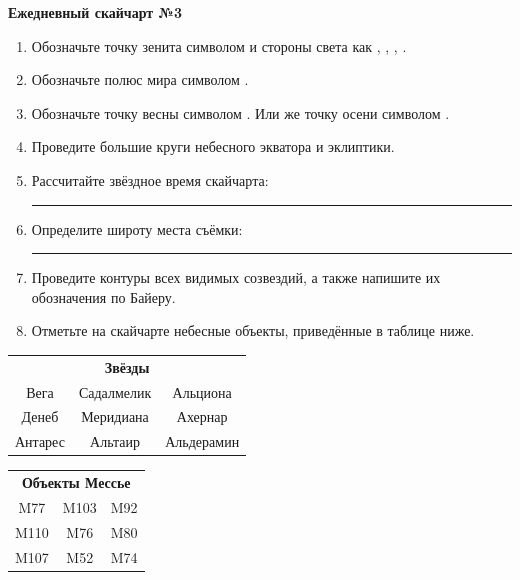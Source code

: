 \documentclass{./SAS-class-skygen}
\begin{document}
    
    
    
	\begin{center}
		\large\textbf{Ежедневный скайчарт №3}
	\end{center}

	\begin{enumerate}
		\item Обозначьте точку зенита символом  и стороны света как , , , .
		\item Обозначьте полюс мира символом .
		\item Обозначьте точку весны символом \Aries. Или же точку осени символом \Libra.
		\item Проведите большие круги небесного экватора и эклиптики.
		\item Рассчитайте звёздное время скайчарта: \rule{2cm}{0.4pt}
		\item Определите широту места съёмки: \rule{2cm}{0.4pt}
		\item Проведите контуры всех видимых созвездий, а также напишите их обозначения по Байеру.
		\item Отметьте на скайчарте небесные объекты, приведённые в таблице ниже.
	\end{enumerate}
	
    \vspace{0.5cm}

    \begin{table}[h!]
    \centering
    \begin{tabular}{ccc}
    \multicolumn{3}{c}{\textbf{Звёзды}} \\ Вега & Садалмелик & Альциона \\
Денеб & Меридиана & Ахернар \\
Антарес & Альтаир & Альдерамин \\

\end{tabular}
    \hfill
    \begin{tabular}{ccc}
    \multicolumn{3}{c}{\textbf{Объекты Мессье}} \\ M77 & M103 & M92 \\
M110 & M76 & M80 \\
M107 & M52 & M74 \\

\end{tabular}
    \end{table}
	
\end{document}
